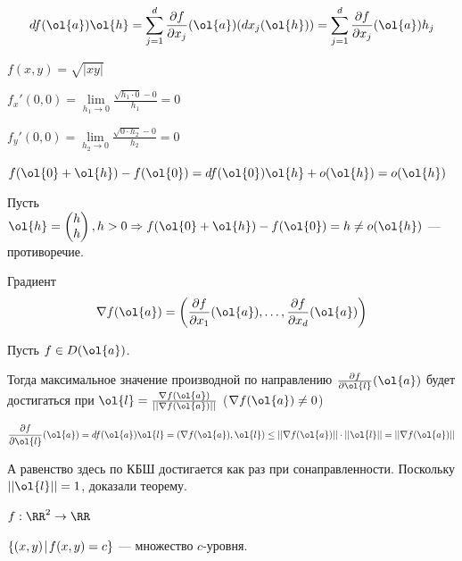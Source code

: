 \begin{remark}{}{}
    \[
        df (\ol{a}) \ol{h}
        =
        \sum\limits_{j = 1}^d \frac{\partial f}{\partial x_j} (\ol{a}) (dx_j (\ol{h}))
        =
        \sum\limits_{j = 1}^d \frac{\partial f}{\partial x_j} (\ol{a}) h_j
    \]
\end{remark}

\begin{example}{}{}
    \( f(x, y) = \sqrt{ |xy| } \)

    \( f_x'(0, 0) = \lim\limits_{h_1 \to 0} \frac{\sqrt{h_1 \cdot 0} - 0}{h_1} = 0 \)

    \( f_y'(0, 0) = \lim\limits_{h_2 \to 0} \frac{\sqrt{0 \cdot h_2} - 0}{h_2} = 0 \)

    \( f(\ol{0} + \ol{h}) - f(\ol{0}) = df(\ol{0}) \ol{h} + o(\ol{h}) = o(\ol{h}) \)

    Пусть
    \(
        \ol{h} = \begin{pmatrix}
            h
            \\
            h
        \end{pmatrix},
        h > 0
        \Rightarrow
        f(\ol{0} + \ol{h}) - f(\ol{0}) = h \neq o(\ol{h})
    \) --- противоречие.
\end{example}

\begin{defn}{Градиент}{}
    \[
        \nabla f (\ol{a}) = \left( \frac{\partial f}{\partial x_1} (\ol{a}), \ldots, \frac{\partial f}{\partial x_d} (\ol{a}) \right)
    \]
\end{defn}

\begin{thrm}{}{}
    Пусть \( f \in D(\ol{a}) \).

    Тогда максимальное значение производной по направлению \( \frac{\partial f}{\partial \ol{l}} (\ol{a}) \)
    будет достигаться при \( \ol{l} = \frac{\nabla f(\ol{a})}{|| \nabla f(\ol{a}) ||} \) (\( \nabla f(\ol{a}) \neq 0 \))
\end{thrm}

\[
    \frac{\partial f}{\partial \ol{l}} (\ol{a}) = df(\ol{a}) \ol{l} = (\nabla f(\ol{a}), \ol{l})
    \leq
    || \nabla f(\ol{a}) || \cdot || \ol{l} ||
    =
    || \nabla f(\ol{a}) ||
\]

А равенство здесь по КБШ достигается как раз при сонаправленности.
Поскольку \( || \ol{l} || = 1 \), доказали теорему.

\begin{defn}{}{}
    \( f : \RR^2 \to \RR \)

    \( \{ (x, y) \: \vline \: f(x, y) = c \} \) --- множество \( c \)-уровня.
\end{defn}

